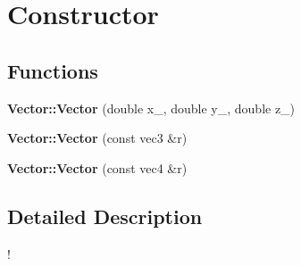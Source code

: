 \hypertarget{group__constructor}{}\section{Constructor}
\label{group__constructor}
\subsection*{Functions}
\begin{DoxyCompactItemize}
\item 
\mbox{\label{group__constructor_ga49b162aa50d22467c35dc5bd13b37ded}} 
{\bfseries Vector\+::\+Vector} (double x\+\_, double y\+\_, double z\+\_)
\item 
\mbox{\label{group__constructor_gacdc4848c4a0ac5cdcc0c0b85a2e6aac8}} 
{\bfseries Vector\+::\+Vector} (const vec3 \&r)
\item 
\mbox{\label{group__constructor_gaebe4c3f60c23167ee70063b2f8c08abc}} 
{\bfseries Vector\+::\+Vector} (const vec4 \&r)
\end{DoxyCompactItemize}


\subsection{Detailed Description}
! 